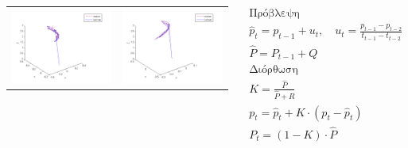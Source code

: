 \documentclass[8pt,sans,mathserif]{beamer}%
\begin{document}
\begin{frame}
\begin{columns}
\begin{tabular}{cc}
            \includegraphics[height = 0.23\textheight, keepaspectratio]{fig/filter0-xyz.png} & \includegraphics[height = 0.23\textheight, keepaspectratio]{fig/filter3-xyz.png}
        \end{tabular}
        
        \pause
        
        \begin{equation*}
            \begin{gathered}
                \text{Πρόβλεψη} \\
                \hat{p}_{t} = p_{t-1} + u_{t}, \quad u_{t} = \frac{p_{t-1} - p_{t-2}}{t_{t-1} - t_{t-2}} \\
                \hat{P} = P_{t-1} + Q \\[.5cm]
                \text{Διόρθωση} \\
                Κ = \frac{\hat{P}}{\hat{P} + R}\\
                p_{t} = \hat{p}_{t} + K \cdot (p_{t} - \hat{p}_{t}) \\
                P_{t} = (1 - K) \cdot \hat{P}
            \end{gathered}
        \end{equation*}
    \end{columns}
    
\end{frame}
\end{document}
